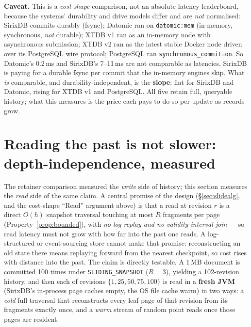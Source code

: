 \documentclass[11pt,a4paper,oneside]{report}
\theoremstyle{sirixthm}
\newcommand{\code}[1]{\texttt{#1}}
\begin{document}
\begin{honesty}
\small\textbf{Caveat.} This is a \emph{cost-shape} comparison, not an absolute-latency leaderboard, because
the systems' durability and drive models differ and are \emph{not} normalised: SirixDB commits durably
(fsync); Datomic ran on \code{datomic:mem} (in-memory, synchronous, \emph{not} durable); XTDB v1 ran as an
in-memory node with asynchronous submission; XTDB v2 ran as the latest stable Docker node driven over its
PostgreSQL wire protocol; PostgreSQL ran \code{synchronous\_commit=on}. So Datomic's 0.2\,ms and SirixDB's
7--11\,ms are not comparable as latencies, SirixDB is paying for a durable fsync per commit that the
in-memory engines skip. What \emph{is} comparable, and durability-independent, is the \textbf{slope}: flat
for SirixDB and Datomic, rising for XTDB v1 and PostgreSQL. All five retain full, queryable history; what
this measures is the price each pays to do so per update as records grow.
\end{honesty}

\section{Reading the past is not slower: depth-independence, measured}
\label{sec:histreadparity}

The retainer comparison measured the \emph{write} side of history; this section measures the \emph{read}
side of the same claim. A central promise of the design (\S\ref{sec:slidealg}, and the cost-shape
``Read'' argument above) is that a read at revision $r$ is a direct $O(h)$ snapshot traversal touching at
most $R$ fragments per page (Property~\ref{prop:bounded}), with \emph{no log replay and no
validity-interval join} --- so read latency must not grow with how far into the past one reads. A
log-structured or event-sourcing store cannot make that promise: reconstructing an old state there means
replaying forward from the nearest checkpoint, so cost rises with distance into the past. The claim is
directly testable. A 1\,MB document is committed 100 times under \code{SLIDING\_SNAPSHOT} ($R=3$),
yielding a 102-revision history, and then each of revisions $\{1,25,50,75,100\}$ is read in a
\textbf{fresh JVM} (SirixDB's in-process page caches empty, the OS file cache warm) in two ways: a
\emph{cold} full traversal that reconstructs every leaf page of that revision from its fragments exactly
once, and a \emph{warm} stream of random point reads once those pages are resident.
\end{document}
